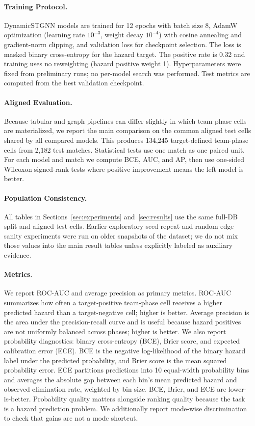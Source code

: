 \paragraph{Training Protocol.}
DynamicSTGNN models are trained for 12 epochs with batch size 8, AdamW
optimization (learning rate \(10^{-3}\), weight decay \(10^{-4}\)) with cosine
annealing and gradient-norm clipping, and validation loss for checkpoint
selection. The loss is masked binary cross-entropy for the hazard target.
The positive rate is 0.32 and training uses no reweighting (hazard positive
weight 1). Hyperparameters were fixed from preliminary runs; no per-model
search was performed. Test metrics are computed from the best validation
checkpoint.

\paragraph{Aligned Evaluation.}
Because tabular and graph pipelines can differ slightly in which team-phase
cells are materialized, we report the main comparison on the common aligned
test cells shared by all compared models. This produces 134,245 target-defined
team-phase cells from 2,182 test matches. Statistical tests use one match as
one paired unit. For each model and match we compute BCE, AUC, and AP, then use
one-sided Wilcoxon signed-rank tests where positive improvement means the left
model is better.

\paragraph{Population Consistency.}
All tables in Sections~\ref{sec:experiments} and~\ref{sec:results} use the
same full-DB split and aligned test cells. Earlier exploratory seed-repeat and
random-edge sanity experiments were run on older snapshots of the dataset; we
do not mix those values into the main result tables unless explicitly labeled
as auxiliary evidence.

\paragraph{Metrics.}
We report ROC-AUC and average precision as primary metrics. ROC-AUC summarizes
how often a target-positive team-phase cell receives a higher predicted hazard
than a target-negative cell; higher is better. Average precision is the area
under the precision-recall curve and is useful because hazard positives are
not uniformly balanced across phases; higher is better. We also report
probability diagnostics: binary cross-entropy (BCE), Brier score, and expected
calibration error (ECE). BCE is the negative log-likelihood of the binary
hazard label under the predicted probability, and Brier score is the mean
squared probability error. ECE partitions predictions into 10 equal-width
probability bins and averages the absolute gap between each bin's mean
predicted hazard and observed elimination rate, weighted by bin size. BCE,
Brier, and ECE are lower-is-better. Probability quality matters alongside
ranking quality because the task is a hazard prediction problem. We
additionally report mode-wise discrimination to check that gains are not a
mode shortcut.
